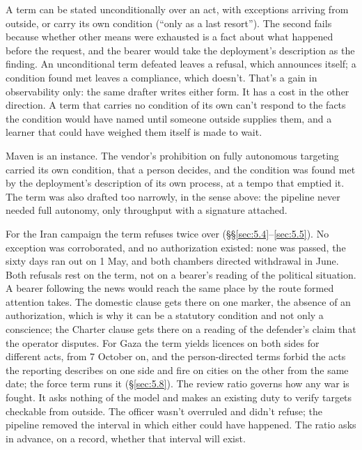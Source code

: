 
A term can be stated unconditionally over an act, with exceptions arriving from outside, or carry its own condition (“only as a last resort”). The second fails because whether other means were exhausted is a fact about what happened before the request, and the bearer would take the deployment's description as the finding. An unconditional term defeated leaves a refusal, which announces itself; a condition found met leaves a compliance, which doesn't. That's a gain in observability only: the same drafter writes either form. It has a cost in the other direction. A term that carries no condition of its own can't respond to the facts the condition would have named until someone outside supplies them, and a learner that could have weighed them itself is made to wait.

Maven is an instance. The vendor's prohibition on fully autonomous targeting carried its own condition, that a person decides, and the condition was found met by the deployment's description of its own process, at a tempo that emptied it. The term was also drafted too narrowly, in the sense above: the pipeline never needed full autonomy, only throughput with a signature attached.


For the Iran campaign the term refuses twice over (\S\S\ref{sec:5.4}–\ref{sec:5.5}). No exception was corroborated, and no authorization existed: none was passed, the sixty days ran out on 1 May, and both chambers directed withdrawal in June. Both refusals rest on the term, not on a bearer's reading of the political situation. A bearer following the news would reach the same place by the route formed attention takes. The domestic clause gets there on one marker, the absence of an authorization, which is why it can be a statutory condition and not only a conscience; the Charter clause gets there on a reading of the defender's claim that the operator disputes. For Gaza the term yields licences on both sides for different acts, from 7 October on, and the person-directed terms forbid the acts the reporting describes on one side and fire on cities on the other from the same date; the force term runs it (\S\ref{sec:5.8}). The review ratio governs how any war is fought. It asks nothing of the model and makes an existing duty to verify targets checkable from outside. The officer wasn't overruled and didn't refuse; the pipeline removed the interval in which either could have happened. The ratio asks in advance, on a record, whether that interval will exist.


